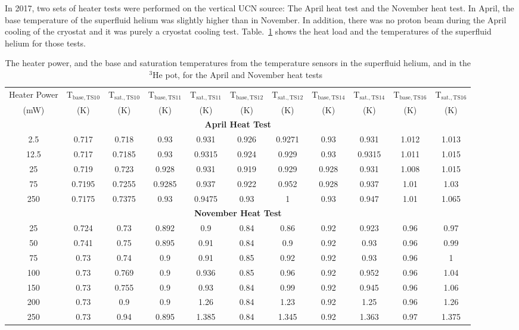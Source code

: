 In 2017, two sets of heater tests were performed on the vertical UCN
source: The April heat test and the November heat test. In April, the
base temperature of the superfluid helium was slightly higher than in
November. In addition, there was no proton beam during the April
cooling of the cryostat and it was purely a cryostat cooling
test. Table.~\ref{tab:heattest} shows the heat load and the
temperatures of the superfluid helium for those tests.

\begin{table}
  \begin{tabular}{|c|c|c|c|c|c|c|c|c|c|c|}
    \hline
    Heater Power & T$_{\mathrm{base, TS10}}$ &  T$_{\mathrm{sat., TS10}}$ & T$_{\mathrm{base, TS11}}$ &  T$_{\mathrm{sat., TS11}}$ & T$_{\mathrm{base, TS12}}$ &  T$_{\mathrm{sat., TS12}}$ & T$_{\mathrm{base, TS14}}$ &  T$_{\mathrm{sat., TS14}}$ & T$_{\mathrm{base, TS16}}$ &  T$_{\mathrm{sat., TS16}}$ \\
    (mW) & (K) & (K) & (K) & (K) & (K) & (K) & (K) & (K) & (K) & (K) \\
    \hline
    \hline
    \multicolumn{11}{|c|}{\textbf{April Heat Test}}\\
    \hline
   2.5 & 0.717 & 0.718 & 0.93 & 0.931 & 0.926 & 0.9271 & 0.93 & 0.931 & 1.012 & 1.013 \\
    \hline
    12.5 & 0.717 & 0.7185 & 0.93 &  0.9315 & 0.924 & 0.929 & 0.93 & 0.9315 & 1.011 & 1.015 \\
    \hline
    25 & 0.719 & 0.723 & 0.928 & 0.931 & 0.919 & 0.929 & 0.928 & 0.931 & 1.008 & 1.015 \\
    \hline
    75 & 0.7195 & 0.7255 & 0.9285 & 0.937 & 0.922 & 0.952 & 0.928 & 0.937 & 1.01 & 1.03 \\
    \hline
    250 & 0.7175 & 0.7375 & 0.93 & 0.9475 & 0.93 & 1 & 0.93 & 0.947 & 1.01 & 1.065 \\
    \hline
    \multicolumn{11}{|c|}{\textbf{November Heat Test}}\\
    \hline
   25 & 0.724 & 0.73 & 0.892 & 0.9 & 0.84 & 0.86 & 0.92 & 0.923 & 0.96 & 0.97 \\
    \hline
    50 & 0.741 & 0.75 & 0.895 & 0.91 & 0.84 & 0.9 & 0.92 & 0.93 & 0.96 & 0.99 \\
    \hline
    75 & 0.73 & 0.74 & 0.9 & 0.91 & 0.85 & 0.92 & 0.92 & 0.93 & 0.96 & 1 \\
    \hline
    100 & 0.73 & 0.769 & 0.9 & 0.936 & 0.85 & 0.96 & 0.92 & 0.952 & 0.96 & 1.04 \\
    \hline
    150 & 0.73 & 0.755 & 0.9 & 0.93 & 0.84 & 0.99 & 0.92 & 0.945 & 0.96 & 1.06 \\
    \hline
    200 & 0.73 & 0.9 & 0.9 & 1.26 & 0.84 & 1.23 & 0.92 & 1.25 & 0.96 & 1.26 \\
    \hline
    250 & 0.73 & 0.94 & 0.895 & 1.385 & 0.84 & 1.345 & 0.92 & 1.363 & 0.97 & 1.375 \\
    \hline
  \end{tabular}
  \caption{The heater power, and the base and saturation temperatures
    from the temperature sensors in the superfluid helium, and in the
    $^3$He pot, for the April and November heat
    tests~\cite{Florian_thesis}}
  \label{tab:heattest}
\end{table}


